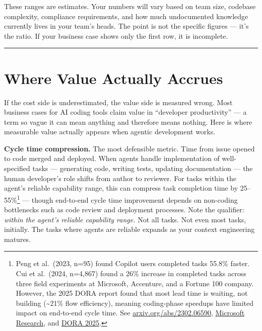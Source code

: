 \documentclass[
  a4paper,
  DIV=11,
  numbers=noendperiod]{scrreprt}
\begin{document}
These ranges are estimates. Your numbers will vary based on team size,
codebase complexity, compliance requirements, and how much undocumented
knowledge currently lives in your team's heads. The point is not the
specific figures --- it's the ratio. If your business case shows only
the first row, it is incomplete.

\begin{center}\rule{0.5\linewidth}{0.5pt}\end{center}

\section{Where Value Actually
Accrues}\label{where-value-actually-accrues}

If the cost side is underestimated, the value side is measured wrong.
Most business cases for AI coding tools claim value in ``developer
productivity'' --- a term so vague it can mean anything and therefore
means nothing. Here is where measurable value actually appears when
agentic development works.

\textbf{Cycle time compression.} The most defensible metric. Time from
issue opened to code merged and deployed. When agents handle
implementation of well-specified tasks --- generating code, writing
tests, updating documentation --- the human developer's role shifts from
author to reviewer. For tasks within the agent's reliable capability
range, this can compress task completion time by 25--55\%\footnote{Peng
  et al.~(2023, n=95) found Copilot users completed tasks 55.8\% faster.
  Cui et al.~(2024, n=4,867) found a 26\% increase in completed tasks
  across three field experiments at Microsoft, Accenture, and a Fortune
  100 company. However, the 2025 DORA report found that most lead time
  is waiting, not building (\textasciitilde21\% flow efficiency),
  meaning coding-phase speedups have limited impact on end-to-end cycle
  time. See
  \href{https://arxiv.org/abs/2302.06590}{arxiv.org/abs/2302.06590},
  \href{https://www.microsoft.com/en-us/research/publication/the-effects-of-generative-ai-on-high-skilled-work-evidence-from-three-field-experiments-with-software-developers/}{Microsoft
  Research}, and
  \href{https://cloud.google.com/resources/content/2025-dora-ai-capabilities-model-report}{DORA
  2025}.} --- though end-to-end cycle time improvement depends on
non-coding bottlenecks such as code review and deployment processes.
Note the qualifier: \emph{within the agent's reliable capability range.}
Not all tasks. Not even most tasks, initially. The tasks where agents
are reliable expands as your context engineering matures.
\end{document}
